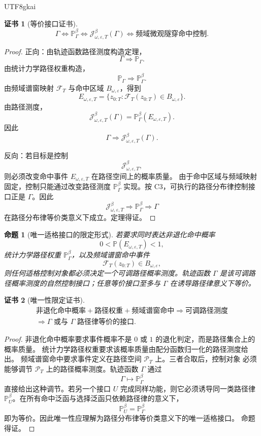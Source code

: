 \documentclass[12pt]{article}
\newtheorem{proposition}{命题}[section]
\newtheorem{Certificate}{证书}[section]
\newcommand{\Prob}{\mathbb P}
\begin{document}
\begin{CJK*}{UTF8}{gkai}
\begin{Certificate}[等价接口证书]
\[
\boxed{
\Gamma
\Longleftrightarrow
\Prob_\Gamma^\beta
\Longleftrightarrow
\mathcal J_{\omega,\varepsilon,T}^{\beta}(\Gamma)
\Longleftrightarrow
\text{频域微观隧穿命中控制}.
}
\]
\end{Certificate}

\begin{proof}
正向：由轨迹函数路径测度构造定理，
\[
\Gamma\Rightarrow\Prob_\Gamma.
\]
由统计力学路径权重构造，
\[
\Prob_\Gamma\Rightarrow\Prob_\Gamma^\beta.
\]
由频域谱窗映射 \(\mathscr F_T\) 与命中区域 \(B_{\omega,\varepsilon}\)，得到
\[
E_{\omega,\varepsilon,T}
=
\{z_{0:T}:\mathscr F_T(z_{0:T})\in B_{\omega,\varepsilon}\}.
\]
由路径测度，
\[
\mathcal J_{\omega,\varepsilon,T}^{\beta}(\Gamma)
=
\Prob_\Gamma^\beta(E_{\omega,\varepsilon,T}).
\]
因此
\[
\Gamma\Rightarrow\mathcal J_{\omega,\varepsilon,T}^{\beta}(\Gamma).
\]

反向：若目标是控制
\[
\mathcal J_{\omega,\varepsilon,T}^{\beta},
\]
则必须改变命中事件 \(E_{\omega,\varepsilon,T}\) 在路径空间上的概率质量。
由于命中区域与频域映射固定，控制只能通过改变路径测度
\(\Prob_\Gamma^\beta\) 实现。按 C3，可执行的路径分布律控制接口正是
\(\Gamma\)。因此
\[
\mathcal J_{\omega,\varepsilon,T}^{\beta}
\Rightarrow
\Prob_\Gamma^\beta
\Rightarrow
\Gamma
\]
在路径分布律等价类意义下成立。定理得证。
\end{proof}

\begin{proposition}[唯一适格接口的限定形式]
若要求同时表达非退化命中概率
\[
0<\Prob(E_{\omega,\varepsilon,T})<1,
\]
统计力学路径权重 \(\Prob_\Gamma^\beta\)，以及频域谱窗命中事件
\[
\mathscr F_T(z_{0:T})\in B_{\omega,\varepsilon},
\]
则任何适格控制对象都必须决定一个可调路径概率测度。轨迹函数
\(\Gamma\) 是该可调路径概率测度的自然控制接口；任意等价接口至多与
\(\Gamma\) 在诱导路径律意义下等价。
\end{proposition}

\begin{Certificate}[唯一性限定证书]
\[
\boxed{
\begin{gathered}
\text{非退化命中概率}
+
\text{路径权重}
+
\text{频域谱窗命中}
\Rightarrow
\text{可调路径测度}
\\
\Rightarrow
\Gamma\text{ 或与 }\Gamma\text{ 路径律等价的接口}.
\end{gathered}
}
\]
\end{Certificate}

\begin{proof}
非退化命中概率要求事件概率不是 \(0\) 或 \(1\) 的退化判定，而是路径集合上的概率质量。
统计力学路径权重要求该概率质量由配分函数归一化的路径测度给出。
频域谱窗命中要求事件定义在路径空间 \(\mathcal P_T\) 上。三者合取后，控制对象
必须能够调节 \(\mathcal P_T\) 上的路径概率测度。轨迹函数 \(\Gamma\) 通过
\[
\Gamma\mapsto\Prob_\Gamma^\beta
\]
直接给出这种调节。若另一个接口 \(U\) 完成同样功能，则它必须诱导同一类路径律
\(\Prob_U^\beta\)。在所有命中泛函与选择泛函只依赖路径律的意义下，
\[
\Prob_U^\beta=\Prob_\Gamma^\beta
\]
即为等价。因此唯一性应理解为路径分布律等价类意义下的唯一适格接口。
命题得证。
\end{proof}


\end{CJK*}
\end{document}
